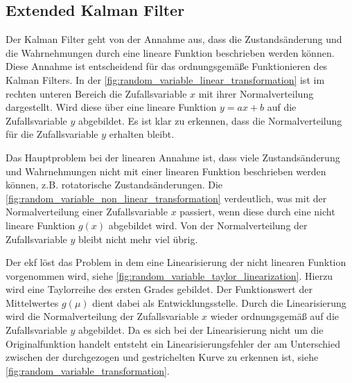 %
%
%
\subsection{Extended Kalman Filter}

Der Kalman Filter geht von der Annahme aus, dass die Zustandsänderung und die Wahrnehmungen durch eine lineare Funktion beschrieben werden können. Diese Annahme ist entscheidend für das ordnungsgemäße Funktionieren des Kalman Filters. In der \autoref{fig:random_variable_linear_transformation} ist im rechten unteren Bereich die Zufallsvariable $x$ mit ihrer Normalverteilung dargestellt. Wird diese über eine lineare Funktion $y=ax+b$ auf die Zufallsvariable $y$ abgebildet. Es ist klar zu erkennen, dass die Normalverteilung für die Zufallsvariable $y$ erhalten bleibt.

Das Hauptproblem bei der linearen Annahme ist, dass viele Zustandsänderung und Wahrnehmungen nicht mit einer linearen Funktion beschrieben werden können, z.B. rotatorische Zustandsänderungen. Die \autoref{fig:random_variable_non_linear_transformation} verdeutlich, was mit der Normalverteilung einer Zufallsvariable $x$ passiert, wenn diese durch eine nicht lineare Funktion $g(x)$ abgebildet wird. Von der Normalverteilung der Zufallsvariable $y$ bleibt nicht mehr viel übrig.

Der \Gls{ekf} löst das Problem in dem eine Linearisierung der nicht linearen Funktion vorgenommen wird, siehe \autoref{fig:random_variable_taylor_linearization}. Hierzu wird eine Taylorreihe des ersten Grades gebildet. Der Funktionswert der Mittelwertes $g(\mu)$ dient dabei als Entwicklungsstelle. Durch die Linearisierung wird die Normalverteilung der Zufallsvariable $x$ wieder ordnungsgemäß auf die Zufallsvariable $y$ abgebildet. Da es sich bei der Linearisierung nicht um die Originalfunktion handelt entsteht ein Linearisierungsfehler der am Unterschied zwischen der durchgezogen und gestrichelten Kurve zu erkennen ist, siehe \autoref{fig:random_variable_transformation}.

